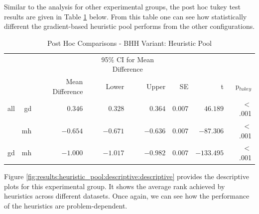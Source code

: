 Similar to the analysis for other experimental groups, the post hoc tukey test results are given in Table \ref{tab:results:heuristic_pool:post_hoc} below. From this table one can see how statistically different the gradient-based heuristic pool performs from the other configurations.

\begin{table}[htbp]
	\centering
	\caption{Post Hoc Comparisons - BHH Variant: Heuristic Pool}
	\label{tab:results:heuristic_pool:post_hoc}%
	\par\bigskip
	\resizebox{\textwidth}{!}
	{
		\begin{tabular}{lrrrrrrr}
			\toprule
			\multicolumn{1}{c}{} & \multicolumn{1}{c}{} & \multicolumn{1}{c}{} & \multicolumn{2}{c}{95\% CI for Mean Difference} & \multicolumn{1}{c}{} & \multicolumn{1}{c}{} & \multicolumn{1}{c}{} \\
			\cline{4-5}
			$ $ & $ $ & Mean Difference & Lower & Upper & SE & t & p$_{tukey}$  \\
			\cmidrule[0.4pt]{1-8}
			all & gd & $0.346$ & $0.328$ & $0.364$ & $0.007$ & $46.189$ & $<$ .001  \\
			$ $ & mh & $-0.654$ & $-0.671$ & $-0.636$ & $0.007$ & $-87.306$ & $<$ .001  \\
			gd & mh & $-1.000$ & $-1.017$ & $-0.982$ & $0.007$ & $-133.495$ & $<$ .001  \\
			\bottomrule
		\end{tabular}
	}
\end{table}

Figure \ref{fig:results:heuristic_pool:descriptive:descriptive} provides the descriptive plots for this experimental group. It shows the average rank achieved by heuristics across different datasets. Once again, we can see how the performance of the heuristics are problem-dependent.

